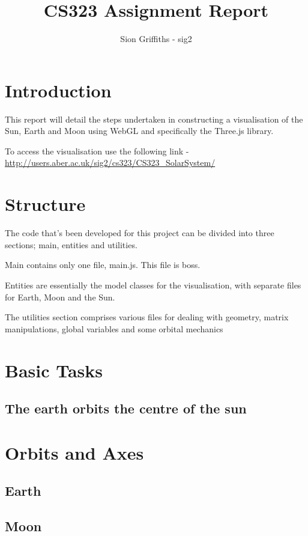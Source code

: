 \documentclass[titlepage]{article}
\title{CS323 Assignment Report}
\author{Sion Griffiths - sig2}
\begin{document}
\maketitle
\tableofcontents




\newpage
\section{Introduction}

This report will detail the steps undertaken in constructing a visualisation of the Sun, Earth and Moon using WebGL and specifically the Three.js library.

To access the visualisation use the following link -  \url{http://users.aber.ac.uk/sig2/cs323/CS323\_SolarSystem/}

\section{Structure}
The code that's been developed for this project can be divided into three sections; main, entities and utilities.

Main contains only one file, main.js. This file is boss.

Entities are essentially the model classes for the visualisation, with separate files for Earth, Moon and the Sun.

The utilities section comprises various files for dealing with geometry, matrix manipulations, global variables and some orbital mechanics 

\section{Basic Tasks}
\subsection{The earth orbits the centre of the sun}


\section{Orbits and Axes}
\subsection{Earth}
\subsection{Moon}
\end{document}
